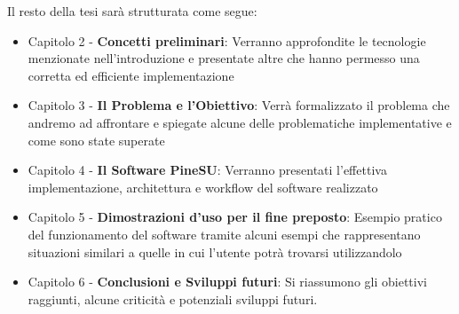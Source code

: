 Il resto della tesi sarà strutturata come segue:
\begin{itemize}
    \item Capitolo 2 - \textbf{Concetti preliminari}: Verranno approfondite le tecnologie menzionate nell'introduzione e presentate altre che hanno permesso una corretta ed efficiente implementazione
    \item Capitolo 3 - \textbf{Il Problema e l'Obiettivo}: Verrà formalizzato il problema che andremo ad affrontare e spiegate alcune delle problematiche implementative e come sono state superate
    \item Capitolo 4 - \textbf{Il Software PineSU}: Verranno presentati l'effettiva implementazione, architettura e workflow del software realizzato
    \item Capitolo 5 - \textbf{Dimostrazioni d'uso per il fine preposto}: Esempio pratico del funzionamento del software tramite alcuni esempi che rappresentano situazioni similari a quelle in cui l'utente potrà trovarsi utilizzandolo
    \item Capitolo 6 - \textbf{Conclusioni e Sviluppi futuri}: Si riassumono gli obiettivi raggiunti, alcune criticità e potenziali sviluppi futuri.
\end{itemize}
